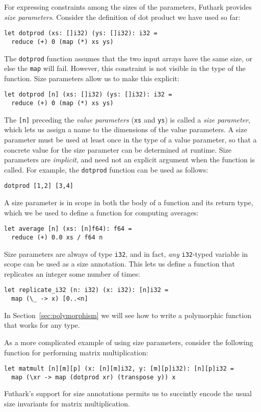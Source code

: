 \documentclass[oneside,11pt]{book}
\begin{document}
For expressing constraints among the sizes of the parameters, Futhark
provides \textit{size parameters}.  Consider the definition of dot
product we have used so far:
\begin{lstlisting}
let dotprod (xs: []i32) (ys: []i32): i32 =
  reduce (+) 0 (map (*) xs ys)
\end{lstlisting}
The \texttt{dotprod} function assumes that the two input arrays have
the same size, or else the \texttt{map} will fail.  However, this
constraint is not visible in the type of the function.  Size
parameters allow us to make this explicit:
\begin{lstlisting}
let dotprod [n] (xs: []i32) (ys: []i32): i32 =
  reduce (+) 0 (map (*) xs ys)
\end{lstlisting}
The \texttt{[n]} preceding the \textit{value parameters} (\texttt{xs}
and \texttt{ys}) is called a \textit{size parameter}, which lets us
assign a name to the dimensions of the value parameters.  A size
parameter must be used at least once in the type of a value parameter,
so that a concrete value for the size parameter can be determined at
runtime.  Size parameters are \textit{implicit}, and need not an
explicit argument when the function is called.  For example, the
\texttt{dotprod} function can be used as follows:
\begin{lstlisting}
dotprod [1,2] [3,4]
\end{lstlisting}

A size parameter is in scope in both the body of a function and its
return type, which we be used to define a function for computing
averages:
\begin{lstlisting}
let average [n] (xs: [n]f64): f64 =
  reduce (+) 0.0 xs / f64 n
\end{lstlisting}
Size parameters are always of type \texttt{i32}, and in fact,
\textit{any} \texttt{i32}-typed variable in scope can be used as a
size annotation.  This lets us define a function that replicates an
integer some number of times:
\begin{lstlisting}
let replicate_i32 (n: i32) (x: i32): [n]i32 =
  map (\_ -> x) [0..<n]
\end{lstlisting}
In Section~\ref{sec:polymorphism} we will see how to write a
polymorphic function that works for any type.

As a more complicated example of using size parameters, consider the
following function for performing matrix multiplication:
\begin{lstlisting}
let matmult [n][m][p] (x: [n][m]i32, y: [m][p]i32): [n][p]i32 =
  map (\xr -> map (dotprod xr) (transpose y)) x
\end{lstlisting}
Futhark's support for size annotations permits us to succintly encode
the usual size invariants for matrix multiplication.
\end{document}
